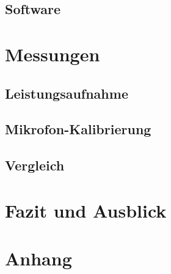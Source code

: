 \documentclass[12pt]{article}
\begin{document}
	\subsection{Software}
	
	\newpage
	\section{Messungen}
	\subsection{Leistungsaufnahme}
	\subsection{Mikrofon-Kalibrierung}
	\subsection{Vergleich}
	
	\newpage
	\section{Fazit und Ausblick}
	
	\newpage
	\section{Anhang}
	
	
	
	
\end{document}
